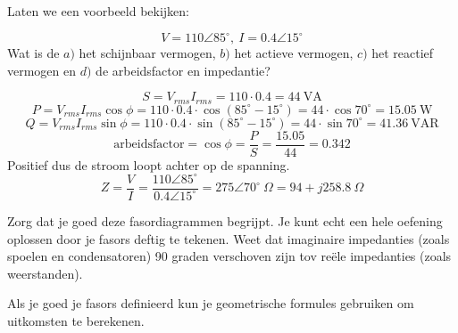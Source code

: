 \documentclass[a4paper,11pt]{article}
\begin{document}


Laten we een voorbeeld bekijken:

$$V = 110\angle 85^\circ,\ I = 0.4\angle 15^\circ$$
Wat is de $a)$ het schijnbaar vermogen, $b)$ het actieve vermogen, $c)$ het reactief vermogen en $d)$ de arbeidsfactor en impedantie?

\[S = V_{rms} I_{rms} = 110 \cdot 0.4 = 44\ \mathrm{VA} \]
\[P = V_{rms} I_{rms} \cos \phi = 110 \cdot 0.4 \cdot \cos(85^\circ - 15^\circ) = 44 \cdot \cos 70^\circ = 15.05\ \mathrm{W}\]
\[Q = V_{rms} I_{rms} \sin \phi = 110 \cdot 0.4 \cdot \sin(85^\circ - 15^\circ) = 44 \cdot \sin 70^\circ = 41.36\ \mathrm{VAR} \]
\[\text{arbeidsfactor} = \cos \phi = \frac{P}{S} = \frac{15.05}{44} = 0.342\]
Positief dus de stroom loopt achter op de spanning.
\[\boxed{Z = \frac{V}{I} = \frac{110\angle 85^\circ}{0.4\angle 15^\circ} = 275\angle 70^\circ\ \Omega = 94 + j258.8\ \Omega}\]

\begin{examenbox}
Zorg dat je goed deze fasordiagrammen begrijpt. 
Je kunt echt een hele oefening oplossen door je fasors deftig te tekenen.
Weet dat imaginaire impedanties (zoals spoelen en condensatoren) 90 graden verschoven zijn tov reële impedanties (zoals weerstanden).
\end{examenbox}

Als je goed je fasors definieerd kun je geometrische formules gebruiken 
om uitkomsten te berekenen.


\vspace{0.5cm}
\end{document}
